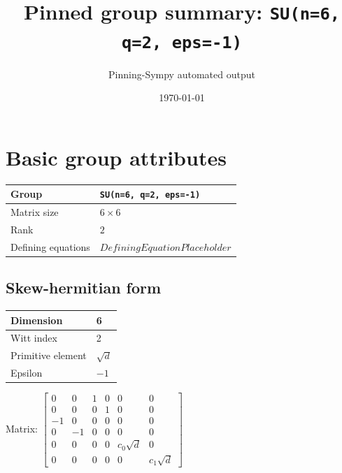 \documentclass[11pt]{article}
\title{Pinned group summary: \texttt{SU(n=6, q=2, eps=-1)}}
\author{Pinning-Sympy automated output}
\date{\today}
\theoremstyle{definition}
\begin{document}
\maketitle
\tableofcontents

\newpage

\section{Basic group attributes}

\begin{tabular}{|l|l|}
	\hline
    Group & \texttt{SU(n=6, q=2, eps=-1)} \\
	\hline
    Matrix size & $6 \times 6$ \\
	\hline
    Rank & $2$ \\
	\hline
	Defining equations & $DefiningEquationPlaceholder$ \\
	\hline
\end{tabular}

\subsection{Skew-hermitian form}
\begin{tabular}{|l|l|}
    \hline
    Dimension & 6 \\
    \hline
    Witt index & 2 \\
    \hline
    Primitive element & $\sqrt{d}$ \\
    \hline
    Epsilon & $-1$ \\
    \hline
\end{tabular}

\bigskip
\noindent Matrix: \(
\left[\begin{matrix}0 & 0 & 1 & 0 & 0 & 0\\0 & 0 & 0 & 1 & 0 & 0\\-1 & 0 & 0 & 0 & 0 & 0\\0 & -1 & 0 & 0 & 0 & 0\\0 & 0 & 0 & 0 & c_{0} \sqrt{d} & 0\\0 & 0 & 0 & 0 & 0 & c_{1} \sqrt{d}\end{matrix}\right]
\)
\end{document}
